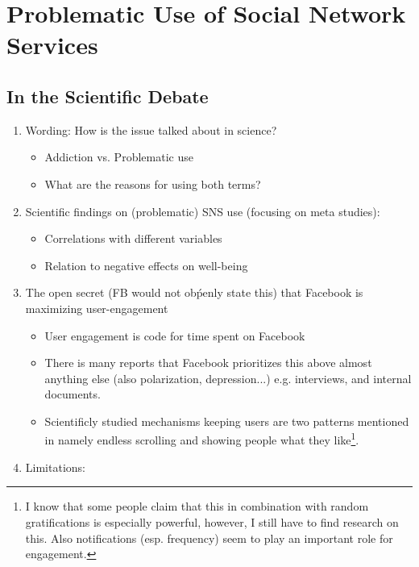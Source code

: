 \section{Problematic Use of Social Network Services}
\label{sec:prob_sns}

\subsection{In the Scientific Debate}
\begin{enumerate}
    \item Wording: How is the issue talked about in science?\begin{itemize}
        \item Addiction vs. Problematic use
        \item What are the reasons for using both terms?
    \end{itemize} 
    \item Scientific findings on (problematic) SNS use (focusing on meta studies): \begin{itemize}
        \item Correlations with different variables
        \item Relation to negative effects on well-being
    \end{itemize} 
    \item The open secret (FB would not obṕenly state this) that Facebook is maximizing user-engagement \begin{itemize}
        \item User engagement is code for time spent on Facebook
        \item There is many reports that Facebook prioritizes this above almost anything else (also polarization, depression...) e.g. interviews, and internal documents.
        \item Scientificly studied mechanisms keeping users  are two patterns mentioned in \citep{montag_addictive_2019} namely endless scrolling and showing people what they like\footnote{I know that some people claim that this in combination with random gratifications is especially powerful, however, I still have to find research on this. Also notifications (esp. frequency) seem to play an important role for engagement.}.
    \end{itemize}
    \item Limitations: \begin{itemize}

\end{itemize}
\end{enumerate}
